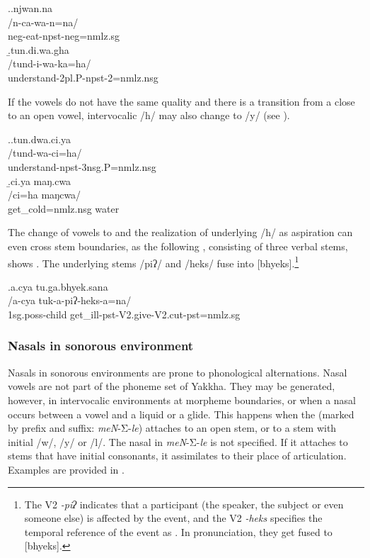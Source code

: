 \ex.\a.\glll njwan.na\\
/n-ca-wa-n=na/\\
{\sc neg-}eat{\sc [3sg.A]-npst-neg=nmlz.sg}\\
\b.\glll  tun.di.wa.gha\\
/tund-i-wa-ka=ha/\\
understand{\sc [3.A]-2pl.P-npst-2=nmlz.nsg}\\

If the vowels do not have the same quality and there is a transition from a close to an open vowel, intervocalic /h/ may also change to /y/  (see \Next).

\ex.\a.\glll   tun.dwa.ci.ya\\
/tund-wa-ci=ha/\\
understand{\sc [3sg.A]-npst-3nsg.P=nmlz.nsg}\\
\b.\glll   ci.ya maŋ.cwa\\
/ci=ha maŋcwa/\\
get\_cold{\sc =nmlz.nsg} water\\

The change of vowels to  and the realization of underlying /h/ as aspiration can even cross stem boundaries, as the following , consisting of three verbal stems, shows \Next. The underlying stems /piʔ/ and /heks/ fuse into [bhyeks].\footnote{The V2 \emph{-piʔ} indicates that a participant (the speaker, the subject or even someone else) is affected by the event, and the V2 \emph{-heks} specifies the temporal reference of the event as . In pronunciation, they get fused to [bhyeks].} 


\ex.\glll a.cya tu.ga.bhyek.sana\\
/a-cya tuk-a-piʔ-heks-a=na/\\
{\sc 1sg.poss}-child  get\_ill{\sc [3sg]-pst-V2.give-V2.cut-pst=nmlz.sg}\\


\subsubsection{Nasals in sonorous environment}\label{nas-son}

Nasals in sonorous environments are prone to phonological alternations. Nasal vowels are not part of the phoneme set of Yakkha. They may be generated, however, in  intervocalic environments at morpheme boundaries, or when a nasal occurs between a vowel and a liquid or a glide. This happens when the  (marked by prefix and suffix: \emph{meN}-Σ-\emph{le}) attaches to an open stem, or to a stem with initial /w/, /y/ or /l/. The nasal in \emph{meN}-Σ-\emph{le} is not specified. If it attaches to stems that have initial consonants, it assimilates to their place of articulation. Examples are provided in . 

